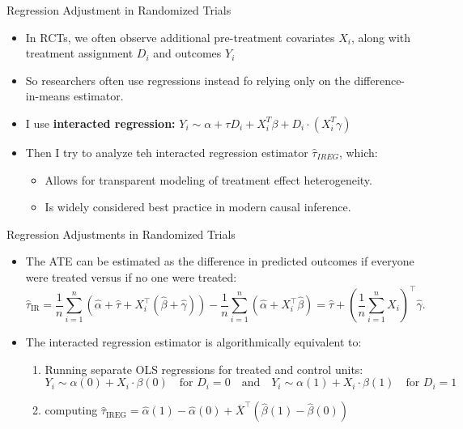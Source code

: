 \documentclass[11pt,aspectratio=169]{beamer}
\begin{document}
\begin{frame}{Regression Adjustment in Randomized Trials}
\begin{itemize}
  \item In RCTs, we often observe additional pre-treatment covariates $X_i$, along with treatment assignment $D_i$ and outcomes $Y_i$
  \item So researchers often use regressions instead fo relying only on the difference-in-means estimator.
  \item I use \textbf{interacted regression:} $Y_i \sim \alpha +\tau D_i+X_i^T\beta +D_i\cdot(X_i^T \gamma)$
  \item Then I try to analyze teh interacted regression estimator $\hat{\tau}_{IREG}$, which:
  \begin{itemize}
    \item Allows for transparent modeling of treatment effect heterogeneity.
    \item Is widely considered best practice in modern causal inference.
  \end{itemize}
\end{itemize}





\end{frame}
\begin{frame}{Regression Adjustments in Randomized Trials}

\begin{itemize}
    \item The ATE can be estimated as the difference in predicted outcomes if everyone were treated versus if no one were treated:
    $$\widehat{\tau}_{\text{IR}} = \frac{1}{n} \sum_{i=1}^n \left(\widehat{\alpha} + \widehat{\tau} + X_i^\top (\widehat{\beta} + \widehat{\gamma})\right) - \frac{1}{n} \sum_{i=1}^n \left(\widehat{\alpha} + X_i^\top \widehat{\beta}\right) = \widehat{\tau} + \left(\frac{1}{n} \sum_{i=1}^n X_i\right)^\top \widehat{\gamma}.$$
    \item The interacted regression estimator is algorithmically equivalent to:
    \begin{enumerate}
        \item Running separate OLS regressions for treated and control units:
        $$Y_i \sim \alpha(0) + X_i \cdot \beta(0) \quad \text{for } D_i = 0 \quad \text{and} \quad Y_i \sim \alpha(1) + X_i \cdot \beta(1) \quad \text{for } D_i = 1$$
        \item computing $\widehat{\tau}_{\text{IREG}} = \widehat{\alpha}(1) - \widehat{\alpha}(0) + \overline{X}^\top (\widehat{\beta}(1) - \widehat{\beta}(0))$
    \end{enumerate}
\end{itemize}

\end{frame}
\end{document}

